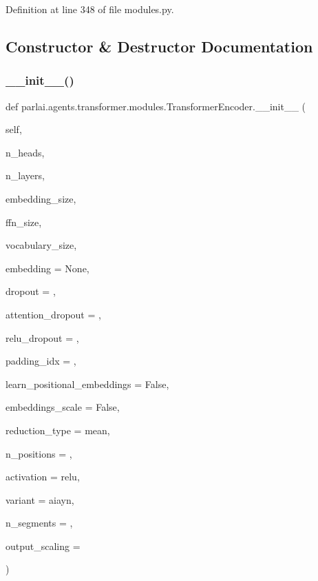 Definition at line 348 of file modules.\+py.



\subsection{Constructor \& Destructor Documentation}
\mbox{\label{classparlai_1_1agents_1_1transformer_1_1modules_1_1TransformerEncoder_a362f8b951877f3712ca59f0fb6a0ae9c}} 
\subsubsection{\texorpdfstring{\+\_\+\+\_\+init\+\_\+\+\_\+()}{\_\_init\_\_()}}
{\footnotesize\ttfamily def parlai.\+agents.\+transformer.\+modules.\+Transformer\+Encoder.\+\_\+\+\_\+init\+\_\+\+\_\+ (\begin{DoxyParamCaption}\item[{}]{self,  }\item[{}]{n\+\_\+heads,  }\item[{}]{n\+\_\+layers,  }\item[{}]{embedding\+\_\+size,  }\item[{}]{ffn\+\_\+size,  }\item[{}]{vocabulary\+\_\+size,  }\item[{}]{embedding = {\ttfamily None},  }\item[{}]{dropout = {},  }\item[{}]{attention\+\_\+dropout = {},  }\item[{}]{relu\+\_\+dropout = {},  }\item[{}]{padding\+\_\+idx = {},  }\item[{}]{learn\+\_\+positional\+\_\+embeddings = {\ttfamily False},  }\item[{}]{embeddings\+\_\+scale = {\ttfamily False},  }\item[{}]{reduction\+\_\+type = {\ttfamily \textquotesingle{}mean\textquotesingle{}},  }\item[{}]{n\+\_\+positions = {},  }\item[{}]{activation = {\ttfamily \textquotesingle{}relu\textquotesingle{}},  }\item[{}]{variant = {\ttfamily \textquotesingle{}aiayn\textquotesingle{}},  }\item[{}]{n\+\_\+segments = {},  }\item[{}]{output\+\_\+scaling = {} }\end{DoxyParamCaption})}



